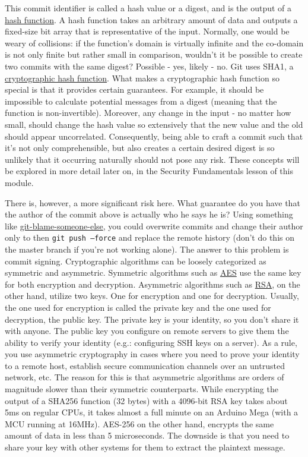 This commit identifier is called a hash value or a digest, and is the output of
a \href{https://en.wikipedia.org/wiki/Hash_function}{hash function}. A hash
function takes an arbitrary amount of data and outputs a fixed-size bit array
that is representative of the input. Normally, one would be weary of collisions:
if the function's domain is virtually infinite and the co-domain is not only
finite but rather small in comparison, wouldn't it be possible to create two
commits with the same digest? Possible - yes, likely - no. Git uses SHA1, a
\href{https://en.wikipedia.org/wiki/Cryptographic_hash_function}{cryptographic
hash function}. What makes a cryptographic hash function so special is that it
provides certain guarantees. For example, it should be impossible to calculate
potential messages from a digest (meaning that the function is non-invertible).
Moreover, any change in the input - no matter how small, should change the hash
value so extensively that the new value and the old should appear uncorrelated.
Consequently, being able to craft a commit such that it's not only
comprehensible, but also creates a certain desired digest is so unlikely that it
occurring naturally should not pose any risk. These concepts will be explored in
more detail later on, in the Security Fundamentals lesson of this module.

There is, however, a more significant risk here. What guarantee do you have that
the author of the commit above is actually who he says he is? Using something
like \href{https://github.com/jayphelps/git-blame-someone-else}
{git-blame-someone-else}, you could overwrite commits and change their author
only to then \texttt{git push --force} and replace the remote history (don't do
this on the master branch if you're not working alone). The answer to this
problem is commit signing. Cryptographic algorithms can be loosely categorized
as symmetric and asymmetric. Symmetric algorithms such as
\href{https://en.wikipedia.org/wiki/Advanced_Encryption_Standard}{AES} use the
same key for both encryption and decryption. Asymmetric algorithms such as
\href{https://en.wikipedia.org/wiki/RSA_cryptosystem}{RSA}, on the other hand,
utilize two keys. One for encryption and one for decryption. Usually, the one
used for encryption is called the private key and the one used for decryption,
the public key. The private key is your identity, so you don't share it with
anyone. The public key you configure on remote servers to give them the ability
to verify your identity (e.g.: configuring SSH keys on a server). As a rule, you
use asymmetric cryptography in cases where you need to prove your identity to a
remote host, establish secure communication channels over an untrusted network,
etc. The reason for this is that asymmetric algorithms are orders of magnitude
slower than their symmetric counterparts. While encrypting the output of a
SHA256 function (32 bytes) with a 4096-bit RSA key takes about 5ms on regular
CPUs, it takes almost a full minute on an Arduino Mega (with a MCU running at
16MHz). AES-256 on the other hand, encrypts the same amount of data in less than
5 microseconds. The downside is that you need to share your key with other
systems for them to extract the plaintext message.

